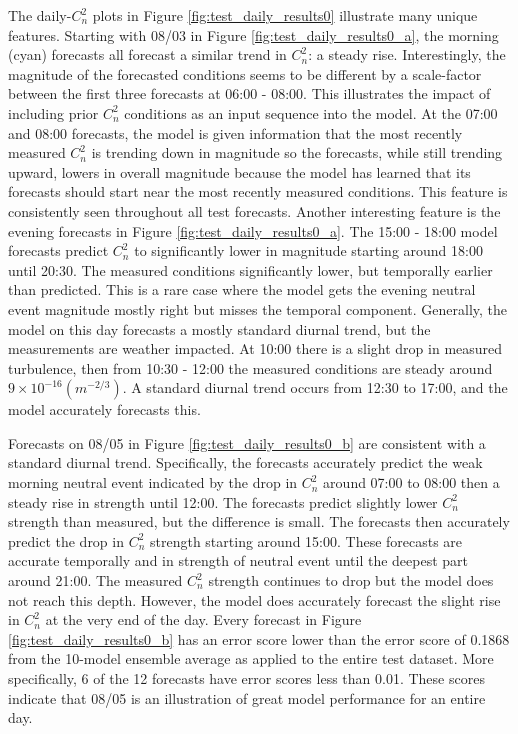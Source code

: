 The daily-$C_{n}^{2}$ plots in Figure \ref{fig:test_daily_results0} illustrate many unique features. Starting with 08/03 in Figure \ref{fig:test_daily_results0_a}, the morning (cyan) forecasts all forecast a similar trend in $C_{n}^{2}$: a steady rise. Interestingly, the magnitude of the forecasted conditions seems to be different by a scale-factor between the first three forecasts at 06:00 - 08:00. This illustrates the impact of including prior $C_{n}^{2}$ conditions as an input sequence into the model. At the 07:00 and 08:00 forecasts, the model is given information that the most recently measured $C_{n}^{2}$ is trending down in magnitude so the forecasts, while still trending upward, lowers in overall magnitude because the model has learned that its forecasts should start near the most recently measured conditions. This feature is consistently seen throughout all test forecasts. Another interesting feature is the evening forecasts in Figure \ref{fig:test_daily_results0_a}. The 15:00 - 18:00 model forecasts predict $C_{n}^{2}$ to significantly lower in magnitude starting around 18:00 until 20:30. The measured conditions significantly lower, but temporally earlier than predicted. This is a rare case where the model gets the evening neutral event magnitude mostly right but misses the temporal component. Generally, the model on this day forecasts a mostly standard diurnal trend, but the measurements are weather impacted. At 10:00 there is a slight drop in measured turbulence, then from 10:30 - 12:00 the measured conditions are steady around $9 \times 10^{-16} (m^{-2/3})$. A standard diurnal trend occurs from 12:30 to 17:00, and the model accurately forecasts this.

Forecasts on 08/05 in Figure \ref{fig:test_daily_results0_b} are consistent with a standard diurnal trend. Specifically, the forecasts accurately predict the weak morning neutral event indicated by the drop in $C_{n}^{2}$ around 07:00 to 08:00 then a steady rise in strength until 12:00. The forecasts predict slightly lower $C_{n}^{2}$ strength than measured, but the difference is small. The forecasts then accurately predict the drop in $C_{n}^{2}$ strength starting around 15:00. These forecasts are accurate temporally and in strength of neutral event until the deepest part around 21:00. The measured $C_{n}^{2}$ strength continues to drop but the model does not reach this depth. However, the model does accurately forecast the slight rise in $C_{n}^{2}$ at the very end of the day. Every forecast in Figure \ref{fig:test_daily_results0_b} has an error score lower than the error score of 0.1868 from the 10-model ensemble average as applied to the entire test dataset. More specifically, 6 of the 12 forecasts have error scores less than 0.01. These scores indicate that 08/05 is an illustration of great model performance for an entire day.

